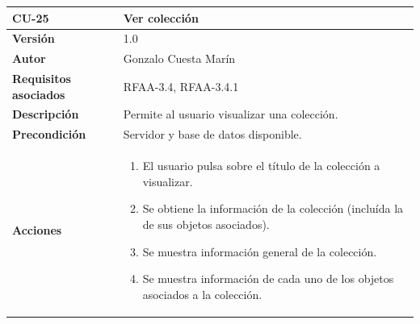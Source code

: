 \documentclass[
]{article}
\providecommand{\tightlist}{%
  \setlength{\itemsep}{0pt}\setlength{\parskip}{0pt}}
\begin{document}
\begin{longtable}[]{@{}ll@{}}
\toprule
\begin{minipage}[b]{0.22\columnwidth}\raggedright
\textbf{CU-25}\strut
\end{minipage} & \begin{minipage}[b]{0.72\columnwidth}\raggedright
\textbf{Ver colección}\strut
\end{minipage}\tabularnewline
\midrule
\endhead
\begin{minipage}[t]{0.22\columnwidth}\raggedright
\textbf{Versión}\strut
\end{minipage} & \begin{minipage}[t]{0.72\columnwidth}\raggedright
1.0\strut
\end{minipage}\tabularnewline
\begin{minipage}[t]{0.22\columnwidth}\raggedright
\textbf{Autor}\strut
\end{minipage} & \begin{minipage}[t]{0.72\columnwidth}\raggedright
Gonzalo Cuesta Marín\strut
\end{minipage}\tabularnewline
\begin{minipage}[t]{0.22\columnwidth}\raggedright
\textbf{Requisitos asociados}\strut
\end{minipage} & \begin{minipage}[t]{0.72\columnwidth}\raggedright
RFAA-3.4, RFAA-3.4.1\strut
\end{minipage}\tabularnewline
\begin{minipage}[t]{0.22\columnwidth}\raggedright
\textbf{Descripción}\strut
\end{minipage} & \begin{minipage}[t]{0.72\columnwidth}\raggedright
Permite al usuario visualizar una colección.\strut
\end{minipage}\tabularnewline
\begin{minipage}[t]{0.22\columnwidth}\raggedright
\textbf{Precondición}\strut
\end{minipage} & \begin{minipage}[t]{0.72\columnwidth}\raggedright
Servidor y base de datos disponible.\strut
\end{minipage}\tabularnewline
\begin{minipage}[t]{0.22\columnwidth}\raggedright
\textbf{Acciones}\strut
\end{minipage} & \begin{minipage}[t]{0.72\columnwidth}\raggedright
\begin{enumerate}
\def\labelenumi{\arabic{enumi}.}
\tightlist
\item
  El usuario pulsa sobre el título de la colección a visualizar.
\item
  Se obtiene la información de la colección (incluída la de sus objetos
  asociados).
\item
  Se muestra información general de la colección.
\item
  Se muestra información de cada uno de los objetos asociados a la
  colección.


\end{enumerate}
\end{minipage}
\end{longtable}
\end{document}
